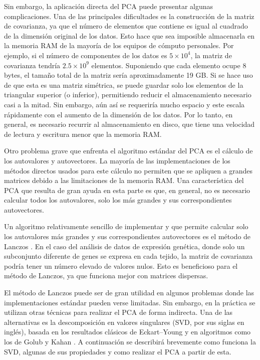 Sin embargo, la aplicación directa del PCA puede presentar algunas complicaciones. Una de las principales dificultades es la construcción de la matriz de covarianza, ya que el número de elementos que contiene es igual al cuadrado de la dimensión original de los datos. Esto hace que sea imposible almacenarla en la memoria RAM de la mayoría de los equipos de cómputo personales. Por ejemplo, si el número de componentes de los datos es $5 \times 10^4$, la matriz de covarianza tendría $2.5 \times 10^9$ elementos. Suponiendo que cada elemento ocupe 8 bytes, el tamaño total de la matriz sería aproximadamente 19 GB. Si se hace uso de que esta es una matriz simétrica, se puede guardar solo los elementos de la triangular superior (o inferior), permitiendo reducir el almacenamiento necesario casi a la mitad. Sin embargo, aún así se requeriría mucho espacio y este escala rápidamente con el aumento de la dimensión de los datos. Por lo tanto, en general, es necesario recurrir al almacenamiento en disco, que tiene una velocidad de lectura y escritura menor que la memoria RAM.

Otro problema grave que enfrenta el algoritmo estándar del PCA es el cálculo de los autovalores y autovectores. La mayoría de las implementaciones de los métodos directos usados para este cálculo no permiten que se apliquen a grandes matrices debido a las limitaciones de la memoria RAM. Una característica del PCA que resulta de gran ayuda en esta parte es que, en general, no es necesario calcular todos los autovalores, solo los más grandes y sus correspondientes autovectores.

Un algoritmo relativamente sencillo de implementar y que permite calcular solo los autovalores más grandes y  sus correspondientes autovectores es el método de Lanczos \cite{Lanczos1950, Paige1972}. En el caso del análisis de datos de expresión genética, donde solo un subconjunto diferente de genes se expresa en cada tejido, la matriz de covarianza podría tener un número elevado de valores nulos. Esto es beneficioso para el método de Lanczos, ya que funciona mejor con matrices dispersas.

El método de Lanczos puede ser de gran utilidad en algunos problemas donde las implementaciones estándar pueden verse limitadas. Sin embargo, en la práctica se utilizan otras técnicas para realizar el PCA de forma indirecta. Una de las alternativas es la descomposición en valores singulares (SVD, por sus siglas en inglés), basada en los resultados clásicos de Eckart–Young \cite{EckartYoung1936} y en algoritmos como los de Golub y Kahan \cite{GolubKahan1965}. %
A continuación se describirá brevemente como funciona la SVD, algunas de sus propiedades y como realizar el PCA a partir de esta.

